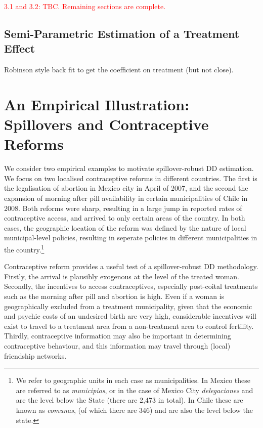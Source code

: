 \documentclass{article}
\begin{document}
\begin{spacing}{1.1}
\textcolor{red}{3.1 and 3.2: TBC.  Remaining sections are complete.}

\subsection{Semi-Parametric Estimation of a Treatment Effect}
Robinson style back fit to get the coefficient on treatment (but not close).
\citet{Imbens2004}

\section{An Empirical Illustration: Spillovers and Contraceptive Reforms}
We consider two empirical examples to motivate spillover-robust DD estimation.
We focus on two localised contraceptive reforms in different countries. The first
is the legalisation of abortion in Mexico city in April of 2007, and the second
the expansion of morning after pill availability in certain municipalities of 
Chile in 2008.  Both reforms were sharp, resulting in a large jump in reported
rates of contraceptive access, and arrived to only certain areas of the country.
In both cases, the geographic location of the reform was defined by the nature
of local municipal-level policies, resulting in seperate policies in different
municipalities in the country.\footnote{We refer to geographic units in each case
as municipalities.  In Mexico these are referred to as \emph{municipios}, or in 
the case of Mexico City \emph{delegaciones} and are the level below the State 
(there are 2,473 in total).  In Chile these are known as \emph{comunas}, (of 
which there are 346) and are also the level below the state.}

Contraceptive reform provides a useful test of a spillover-robust DD methodology.
Firstly, the arrival is plausibly exogenous at the level of the treated woman.
Secondly, the incentives to access contraceptives, especially post-coital 
treatments such as the morning after pill and abortion is high.  Even if a woman
is geographically excluded from a treatment municipality, given that the economic
and psychic costs of an undesired birth are very high, considerable incentives
will exist to travel to a treatment area from a non-treatment area to control
fertility.  Thirdly, contraceptive information may also be important in
determining contraceptive behaviour, and this information may travel through
(local) friendship networks.


\end{spacing}
\end{document}
